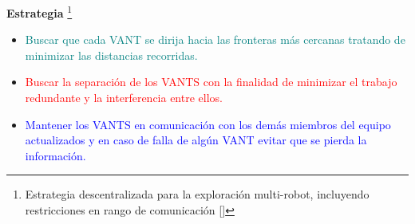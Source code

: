 \documentclass[
  24pt, %
  aspectratio=169, %
]{beamer}
\begin{document}
\begin{frame}

  \textbf{Estrategia} \footnote{Estrategia descentralizada para la exploración multi-robot, incluyendo restricciones en rango de comunicación [\cite{LEAL2013}]}\\
  
  \begin{minipage}{0.67\textwidth}
    \begin{itemize}
    \item[] \textcolor{teal}{Buscar que cada VANT se dirija hacia las fronteras más cercanas tratando de minimizar las distancias recorridas.}
      \bigskip %
    \item[] \textcolor{red}{Buscar la separación de los VANTS con la finalidad de minimizar el trabajo redundante y la interferencia entre ellos.}
      \bigskip %
    \item[] \textcolor{blue}{Mantener los VANTS en comunicación con los demás miembros del equipo actualizados y en caso de falla de algún VANT evitar que se pierda la información.}
    \end{itemize}
  \end{minipage}
  \hspace{0.6cm}
  \begin{minipage}{0.2\textwidth}

\end{minipage}
\end{frame}
\end{document}
